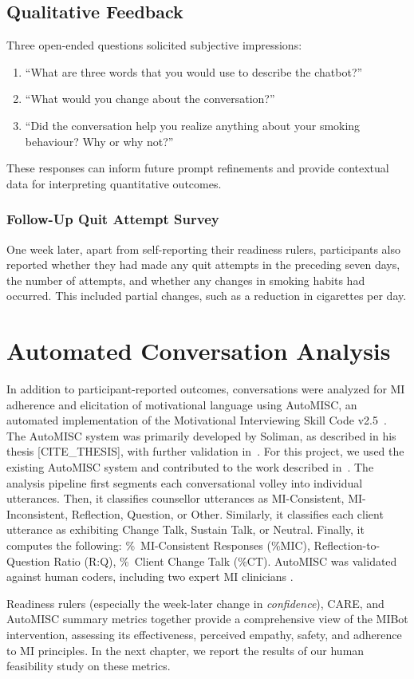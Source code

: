 \subsection{Qualitative Feedback}
Three open-ended questions solicited subjective impressions:
\begin{enumerate}
    \item ``What are three words that you would use to describe the chatbot?''
    \item ``What would you change about the conversation?''
    \item ``Did the conversation help you realize anything about your smoking behaviour? Why or why not?''
\end{enumerate}
These responses can inform future prompt refinements and provide contextual data for interpreting quantitative outcomes.

\subsubsection{Follow-Up Quit Attempt Survey}
One week later, apart from self-reporting their readiness rulers, participants also reported whether they had made any quit attempts in the preceding seven days, the number of attempts, and whether any changes in smoking habits had occurred. This included partial changes, such as a reduction in cigarettes per day.

\section{Automated Conversation Analysis}
\label{subsec:automisc}
In addition to participant-reported outcomes, conversations were analyzed for MI adherence and elicitation of motivational language using AutoMISC, an automated implementation of the Motivational Interviewing Skill Code v2.5~\citep{Houck2010}. The AutoMISC system was primarily developed by Soliman, as described in his thesis [CITE\_THESIS], with further validation in~\cite{ali2025automated}. For this project, we used the existing AutoMISC system and contributed to the work described in~\cite{mahmood-etal-2025-fully}. The analysis pipeline first segments each conversational volley into individual utterances. Then, it classifies counsellor utterances as MI-Consistent, MI-Inconsistent, Reflection, Question, or Other. Similarly, it classifies each client utterance as exhibiting Change Talk, Sustain Talk, or Neutral. Finally, it computes the following: \%~MI-Consistent Responses (\%MIC), Reflection-to-Question Ratio (R:Q), \%~Client Change Talk (\%CT). AutoMISC was validated against human coders, including two expert MI clinicians \cite{mahmood-etal-2025-fully}.

Readiness rulers (especially the week-later change in \emph{confidence}), CARE, and AutoMISC summary metrics together provide a comprehensive view of the MIBot intervention, assessing its effectiveness, perceived empathy, safety, and adherence to MI principles. In the next chapter, we report the results of our human feasibility study on these metrics.
